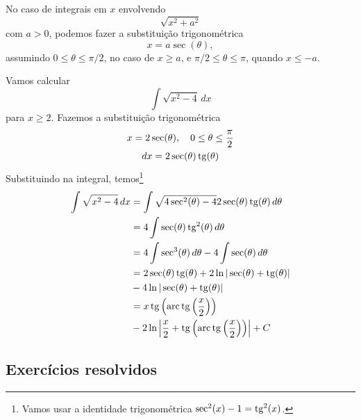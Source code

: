 No caso de integrais em $x$ envolvendo
\begin{equation}
  \sqrt{x^2+a^2}
\end{equation}
com $a>0$, podemos fazer a substituição trigonométrica
\begin{equation}
  x = a\sec(\theta),
\end{equation}
assumindo $0\leq\theta\leq\pi/2$, no caso de $x\geq a$, e $\pi/2\leq\theta\leq\pi$, quando $x\leq -a$.

\begin{ex}
  Vamos calcular
  \begin{equation}
    \int\sqrt{x^2-4}\,dx
  \end{equation}
  para $x\geq 2$. Fazemos a substituição trigonométrica
  \begin{gather}
    x = 2\sec(\theta),\quad 0\leq\theta\leq\frac{\pi}{2}\\
    dx = 2\sec(\theta)\operatorname{tg}(\theta)
  \end{gather}
  Substituindo na integral, temos\footnote{Vamos usar a identidade trigonométrica $\sec^2(x)-1=\operatorname{tg}^2(x)$.}
  \begin{align}
    \int\sqrt{x^2-4}\,dx &= \int\sqrt{4\sec^2(\theta)-4}2\sec(\theta)\operatorname{tg}(\theta)\,d\theta\\
                         &= 4\int\sec(\theta)\operatorname{tg}^2(\theta)\,d\theta\\
                         &= 4\int\sec^3(\theta)\,d\theta - 4\int\sec(\theta)\,d\theta\\
                         &= 2\sec(\theta)\operatorname{tg}(\theta) + 2\ln|\sec(\theta)+\operatorname{tg}(\theta)| \\
                         &- 4\ln|\sec(\theta)+\operatorname{tg}(\theta)|\\
                         &= x\operatorname{tg}\left(\operatorname{arc}\operatorname{tg}\left(\frac{x}{2}\right)\right) \\
                         &- 2\ln\left|\frac{x}{2}+\operatorname{tg}\left(\operatorname{arc}\operatorname{tg}\left(\frac{x}{2}\right)\right)\right| + C
  \end{align}
\end{ex}

\subsection{Exercícios resolvidos}

